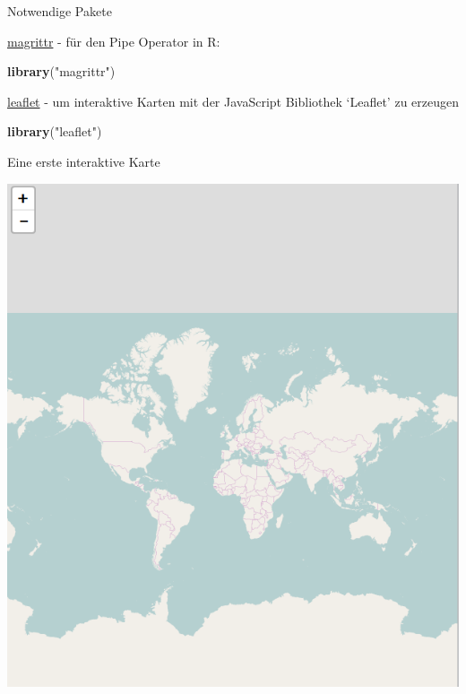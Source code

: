 \documentclass[ignorenonframetext,]{beamer}
\newenvironment{Shaded}{\begin{snugshade}}{\end{snugshade}}
\newcommand{\KeywordTok}[1]{\textcolor[rgb]{0.13,0.29,0.53}{\textbf{#1}}}
\newcommand{\NormalTok}[1]{#1}
\newcommand{\OperatorTok}[1]{\textcolor[rgb]{0.81,0.36,0.00}{\textbf{#1}}}
\newcommand{\StringTok}[1]{\textcolor[rgb]{0.31,0.60,0.02}{#1}}
\begin{document}
\begin{frame}[fragile]{Notwendige Pakete}
\protect\hypertarget{notwendige-pakete}{}

\href{https://cran.r-project.org/web/packages/magrittr/index.html}{magrittr}
- für den Pipe Operator in R:

\begin{Shaded}
\begin{Highlighting}[]
\KeywordTok{library}\NormalTok{(}\StringTok{"magrittr"}\NormalTok{)}
\end{Highlighting}
\end{Shaded}

\href{https://rstudio.github.io/leaflet/}{leaflet} - um interaktive
Karten mit der JavaScript Bibliothek `Leaflet' zu erzeugen

\begin{Shaded}
\begin{Highlighting}[]
\KeywordTok{library}\NormalTok{(}\StringTok{"leaflet"}\NormalTok{)}
\end{Highlighting}
\end{Shaded}

\end{frame}

\begin{frame}[fragile]{Eine erste interaktive Karte}
\protect\hypertarget{eine-erste-interaktive-karte}{}

\begin{Shaded}
\end{Shaded}

\includegraphics{figure/FirstLeaflet.PNG}

\end{frame}
\end{document}
